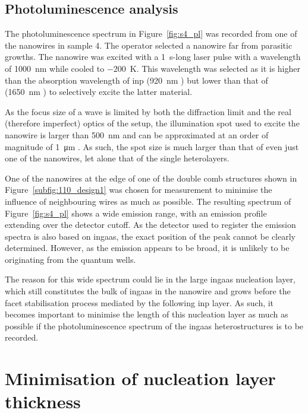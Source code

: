 \subsection{Photoluminescence analysis}

The photoluminescence spectrum in Figure~\ref{fig:s4_pl} was recorded from one of the nanowires in sample 4. The operator selected a nanowire far from parasitic growths. The nanowire was excited with a \qty{1}{\second}-long laser pulse with a wavelength of \qty{1000}{\nano\metre} while cooled to \qty{-200}{\kelvin}. This wavelength was selected as it is higher than the absorption wavelength of \acs{inp} (\qty{920}{\nano\metre} \cite{Bachmann1981}) but lower than that of  (\qty{1650}{\nano\metre} \cite{Takeda1976}) to selectively excite the latter material. 

As the focus size of a wave is limited by both the diffraction limit and the real (therefore imperfect) optics of the setup, the illumination spot used to excite the nanowire is larger than \qty{500}{\nano\metre} and can be approximated at an order of magnitude of \qty{1}{\micro\metre} \cite{Scherrer2021}. As such, the spot size is much larger than that of even just one of the nanowires, let alone that of the single heterolayers. 

One of the nanowires at the edge of one of the double comb structures shown in Figure~\ref{subfig:110_design1} was chosen for measurement to minimise the influence of neighbouring wires as much as possible. The resulting spectrum of Figure~\ref{fig:s4_pl} shows a wide emission range, with an emission profile extending over the detector cutoff. As the detector used to register the emission spectra is also based on \acs{ingaas}, the exact position of the peak cannot be clearly determined. However, as the emission appears to be broad, it is unlikely to be originating from the quantum wells.

The reason for this wide spectrum could lie in the large \acs{ingaas} nucleation layer, which still constitutes the bulk of \acs{ingaas} in the nanowire and grows before the facet stabilisation process mediated by the following \acs{inp} layer. As such, it becomes important to minimise the length of this nucleation layer as much as possible if the photoluminescence spectrum of the \acs{ingaas} heterostructures is to be recorded.

\section{Minimisation of nucleation layer thickness}
\label{sec:s5}


